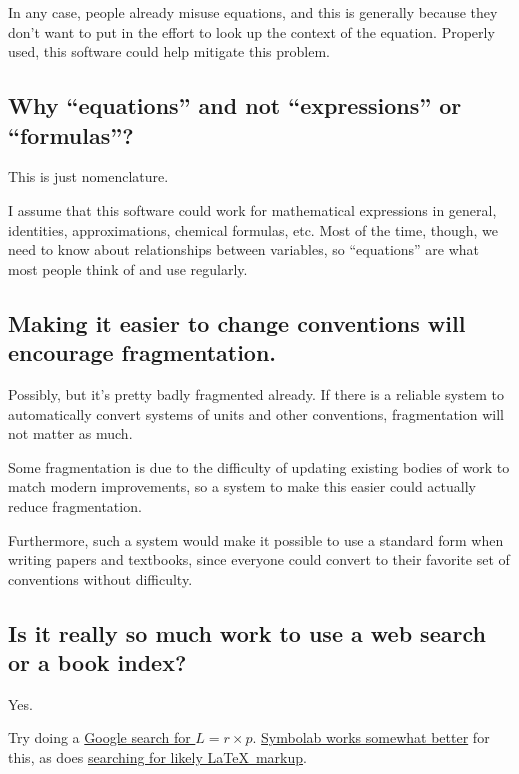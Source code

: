\documentclass[12pt,letterpaper]{article}
\begin{document}
In any case, people already misuse equations,
and this is generally because they don't want to put in the effort to look up the context of the equation.
Properly used, this software could help mitigate this problem.

\subsection{Why ``equations'' and not ``expressions'' or ``formulas''?}

This is just nomenclature.

I assume that this software could work for mathematical expressions in general,
identities, approximations, chemical formulas, etc.
Most of the time, though,
we need to know about relationships between variables,
so ``equations'' are what most people think of and use regularly.

\subsection{Making it easier to change conventions will encourage fragmentation.}

Possibly, but it's pretty badly fragmented already.
If there is a reliable system to automatically convert systems of units and other conventions,
fragmentation will not matter as much.

Some fragmentation is due to the difficulty of updating existing bodies of work to match modern improvements,
so a system to make this easier could actually reduce fragmentation.

Furthermore,
such a system would make it possible to use a standard form when writing papers and textbooks,
since everyone could convert to their favorite set of conventions without difficulty.

\subsection{Is it really so much work to use a web search or a book index?}

Yes.

Try doing a
\href{https://www.google.com/search?q=%22L+%3D+r+%C3%97+P%22&oq=%22L+%3D+r+%C3%97+P%22}
{Google search for $L = r \times p$}.
\href{http://symbolab.com/search?origin=suggestion&query=L%3Dr%5Ctimes%20p}
{Symbolab works somewhat better} for this, as does
\href{https://www.google.com/search?&q=%22L+%3D+r+%5Ctimes+P%22&oq=%22L+%3D+r+%5Ctimes+P%22}
{searching for likely \LaTeX\ markup}.
\end{document}
